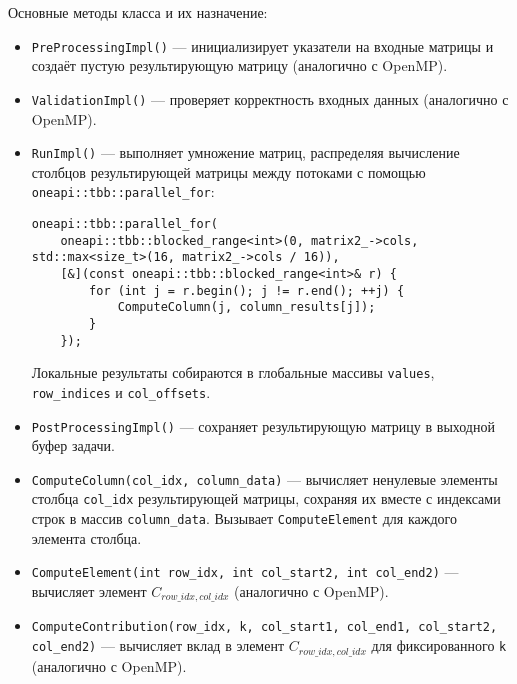 \documentclass[12pt]{extarticle}
\begin{document}
Основные методы класса и их назначение:
\begin{itemize}
    \item \texttt{PreProcessingImpl()} — инициализирует указатели на входные матрицы и создаёт пустую результирующую матрицу (аналогично с OpenMP).
    \item \texttt{ValidationImpl()} — проверяет корректность входных данных (аналогично с OpenMP).
    \item \texttt{RunImpl()} — выполняет умножение матриц, распределяя вычисление столбцов результирующей матрицы между потоками с помощью \texttt{oneapi::tbb::parallel\_for}:
    \begin{lstlisting}[caption={Параллельное вычисление столбцов в методе RunImpl},label={lst:tbb_run}]
oneapi::tbb::parallel_for(
    oneapi::tbb::blocked_range<int>(0, matrix2_->cols, std::max<size_t>(16, matrix2_->cols / 16)),
    [&](const oneapi::tbb::blocked_range<int>& r) {
        for (int j = r.begin(); j != r.end(); ++j) {
            ComputeColumn(j, column_results[j]);
        }
    });
    \end{lstlisting}
    Локальные результаты собираются в глобальные массивы \texttt{values}, \texttt{row\_indices} и \texttt{col\_offsets}.
    \item \texttt{PostProcessingImpl()} — сохраняет результирующую матрицу в выходной буфер задачи.
    \item \texttt{ComputeColumn(col\_idx, column\_data)} — вычисляет ненулевые элементы столбца \texttt{col\_idx} результирующей матрицы, сохраняя их вместе с индексами строк в массив \texttt{column\_data}. Вызывает \texttt{ComputeElement} для каждого элемента столбца.
    \item \texttt{ComputeElement(int row\_idx, int col\_start2, int col\_end2)} — вычисляет элемент $C_{row\_idx, col\_idx}$ (аналогично с OpenMP).
    \item \texttt{ComputeContribution(row\_idx, k, col\_start1, col\_end1, col\_start2, col\_end2)} — вычисляет вклад в элемент  $C_{row\_idx, col\_idx}$  для фиксированного \texttt{k} (аналогично с OpenMP).
\end{itemize}
\end{document}
